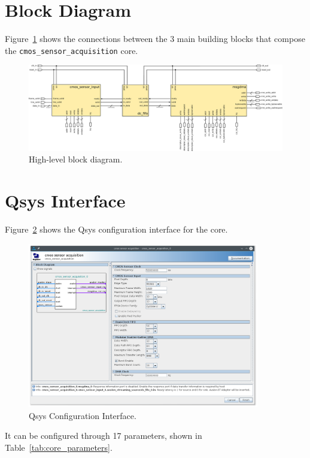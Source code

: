 \documentclass{article}
\def \cmossensoracquisition {\texttt{cmos\_sensor\_acquisition} }
\begin{document}
\newpage

\section{Block Diagram}
Figure~\ref{fig:block_diagram_internal} shows the connections between the 3 main building blocks that compose the \cmossensoracquisition core.

\begin{figure}[h]
    \centering
    \includegraphics[width=1.0\textwidth]{fig/block_diagram_internal}
    \caption{High-level block diagram.}
    \label{fig:block_diagram_internal}
\end{figure}

\section{Qsys Interface}
Figure~\ref{fig:qsys_gui} shows the Qsys configuration interface for the core.
\begin{figure}[h]
    \centering
    \includegraphics[width=0.9\textwidth]{fig/qsys_gui}
    \caption{Qsys Configuration Interface.}
    \label{fig:qsys_gui}
\end{figure}

It can be configured through 17 parameters, shown in Table~\ref{tab:core_parameters}.
\end{document}
